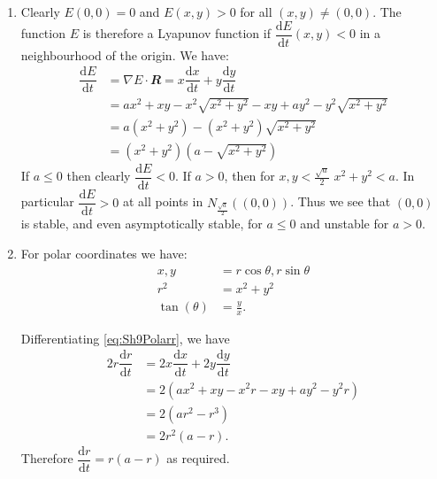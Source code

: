 \documentclass[
  a4paper,
  oneside,
  final]{krantz}
\renewcommand{\d}{\mathrm{d}}
\renewcommand{\v}[1]{{\mathbfit{#1}}}
\newcommand{\der}[2]{\dfrac{\d #1}{\d #2}}
\theoremstyle{definition}
\theoremstyle{definition}
\theoremstyle{definition}
\theoremstyle{definition}
\theoremstyle{remark}
\begin{document}
\begin{enumerate}
\def\labelenumi{\alph{enumi}.}
\item
  Clearly \(E(0,0) = 0\) and \(E(x,y)>0\) for all \((x,y) \ne (0,0)\). The function \(E\) is therefore a Lyapunov function if \(\der{E}{t}(x,y)<0\) in a neighbourhood of the origin. We have:
  \begin{align*}
  \der{E}{t} &= \nabla E \cdot \v{R} =  x \der{x}{t} + y \der{y}{t} \\ 
          &= ax^2 + xy - x^2 \sqrt{x^2 + y^2} -xy + ay^2  - y^2 \sqrt{x^2 + y^2}\\
          &= a(x^2 +y^2) - (x^2 + y^2)\sqrt{x^2 + y^2}\\
          &= (x^2+y^2)\left(a - \sqrt{x^2 + y^2}\right)
  \end{align*}
  If \(a \le 0\) then clearly \(\der{E}{t}<0\). If \(a>0\), then for \(x,y < \frac{\sqrt{a}}{2}\) \(x^2 + y^2 <a\). In particular \(\der{E}{t}>0\) at all points in \(N_{\frac{\sqrt{a}}{2}}((0,0))\). Thus we see that \((0,0)\) is stable, and even asymptotically stable, for \(a \le 0\) and unstable for \(a>0\).
\item
  For polar coordinates we have:
  \begin{align}
   x,y &= r \cos \theta, r \sin \theta \label{eq:Sh9Polar1} \\
   r^2 &= x^2 + y^2 \label{eq:Sh9Polarr} \\
   \tan(\theta) &= \frac{y}{x}. \label{eq:Sh9Polart}
   \end{align}

  Differentiating \eqref{eq:Sh9Polarr}, we have
  \begin{align}
    2r \der{r}{t} &= 2x \der{x}{t} + 2y \der{y}{t} \\
                  &= 2(ax^2 + xy -x^2 r - xy + ay^2 -y^2 r)\\
                  &= 2(a r^2 -r^3) \\
                  &= 2r^2(a-r).
   \end{align}
  Therefore \(\der{r}{t} = r(a-r)\) as required.


\end{enumerate}
\end{document}
